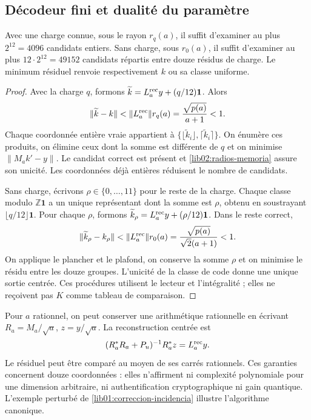 \subsection{Décodeur fini et dualité du paramètre}
\label{lib02:computacion}

\begin{proposition}
\label{lib02:decodificador}
Avec une charge connue, sous le rayon \(r_q(a)\), il suffit d'examiner au plus \(2^{12}=4096\) candidats entiers. Sans charge, sous \(r_0(a)\), il suffit d'examiner au plus \(12\cdot2^{12}=49152\) candidats répartis entre douze résidus de charge. Le minimum résiduel renvoie respectivement \(k\) ou sa classe uniforme.
\end{proposition}
\begin{proof}
Avec la charge \(q\), formons
\(\widetilde k=L_a^{\rm rec}y+(q/12)\mathbf1\). Alors
\[
 \|\widetilde k-k\|
 <\|L_a^{\rm rec}\|r_q(a)
 =\frac{\sqrt{p(a)}}{a+1}<1.
\]
Chaque coordonnée entière vraie appartient à
\(\{\lfloor\widetilde k_i\rfloor,
\lceil\widetilde k_i\rceil\}\). On énumère ces produits,
on élimine ceux dont la somme est différente de \(q\) et on minimise
\(\|M_ak'-y\|\). Le candidat correct est présent et
\cref{lib02:radios-memoria} assure son unicité. Les coordonnées déjà entières
réduisent le nombre de candidats.

Sans charge, écrivons \(\rho\in\{0,\ldots,11\}\) pour le reste
de la charge. Chaque classe modulo \(\mathbb Z\mathbf1\) a un
unique représentant dont la somme est \(\rho\), obtenu en soustrayant
\(\lfloor q/12\rfloor\mathbf1\). Pour chaque \(\rho\), formons
\(\widetilde k_\rho=L_a^{\rm rec}y+(\rho/12)\mathbf1\).
Dans le reste correct,
\[
 \|\widetilde k_\rho-k_\rho\|
 <\|L_a^{\rm rec}\|r_0(a)
 =\frac{\sqrt{p(a)}}{\sqrt2(a+1)}<1.
\]
On applique le plancher et le plafond, on conserve la somme \(\rho\) et on minimise le résidu entre les douze groupes. L'unicité de la classe de code donne une unique sortie centrée. Ces procédures utilisent le lecteur et l'intégralité ; elles ne reçoivent pas \(K\) comme tableau de comparaison.
\end{proof}

Pour \(a\) rationnel, on peut conserver une arithmétique rationnelle en écrivant
\(R_a=M_a/\sqrt a\), \(z=y/\sqrt a\). La reconstruction centrée
est
\[
 (R_a^*R_a+P_u)^{-1}R_a^*z=L_a^{\rm rec}y.
\]
Le résiduel peut être comparé au moyen de ses carrés rationnels. Ces
garanties concernent douze coordonnées : elles n’affirment ni complexité
polynomiale pour une dimension arbitraire, ni authentification cryptographique ni
gain quantique. L’exemple perturbé de
\cref{lib01:correccion-incidencia} illustre l’algorithme canonique.

